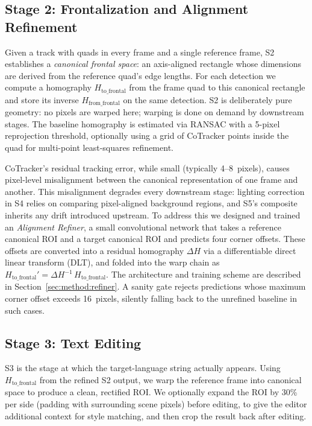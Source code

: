 \subsection{Stage 2: Frontalization and Alignment Refinement}
\label{sec:method:s2}

Given a track with quads in every frame and a single reference
frame, S2 establishes a \emph{canonical frontal space}: an
axis-aligned rectangle whose dimensions are derived from the
reference quad's edge lengths. For each detection we compute a
homography $H_{\mathrm{to\_frontal}}$ from the frame quad to this
canonical rectangle and store its inverse
$H_{\mathrm{from\_frontal}}$ on the same detection. S2 is
deliberately pure geometry: no pixels are warped here; warping is
done on demand by downstream stages. The baseline homography is
estimated via RANSAC with a 5-pixel reprojection threshold,
optionally using a grid of CoTracker points inside the quad for
multi-point least-squares refinement.

CoTracker's residual tracking error, while small (typically
4--8~pixels), causes pixel-level misalignment between the canonical
representation of one frame and another. This misalignment degrades
every downstream stage: lighting correction in S4 relies on
comparing pixel-aligned background regions, and S5's composite
inherits any drift introduced upstream. To address this we
designed and trained an \emph{Alignment Refiner}, a small
convolutional network that takes a reference canonical ROI and a
target canonical ROI and predicts four corner offsets. These
offsets are converted into a residual homography $\Delta H$ via a
differentiable direct linear transform (DLT), and folded into the
warp chain as $H_{\mathrm{to\_frontal}}' = \Delta H^{-1}\,
H_{\mathrm{to\_frontal}}$. The architecture and training scheme are
described in Section~\ref{sec:method:refiner}. A sanity gate
rejects predictions whose maximum corner offset exceeds 16~pixels,
silently falling back to the unrefined baseline in such cases.

\subsection{Stage 3: Text Editing}
\label{sec:method:s3}

S3 is the stage at which the target-language string actually
appears. Using $H_{\mathrm{to\_frontal}}$ from the refined S2
output, we warp the reference frame into canonical space to produce
a clean, rectified ROI. We optionally expand the ROI by 30\% per
side (padding with surrounding scene pixels) before editing, to
give the editor additional context for style matching, and then
crop the result back after editing.

